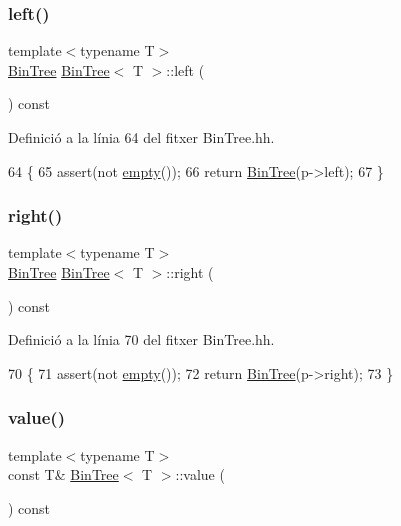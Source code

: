 \subsubsection{\texorpdfstring{left()}{left()}}
{\footnotesize\ttfamily template$<$typename T$>$ \\
\hyperlink{class_bin_tree}{Bin\+Tree} \hyperlink{class_bin_tree}{Bin\+Tree}$<$ T $>$\+::left (\begin{DoxyParamCaption}{ }\end{DoxyParamCaption}) const}



Definició a la línia 64 del fitxer Bin\+Tree.\+hh.


\begin{DoxyCode}
64                           \{
65         assert(not \hyperlink{class_bin_tree_a74cda259ba5c25b8ee38ed4dc33e4fad}{empty}());
66         \textcolor{keywordflow}{return} \hyperlink{class_bin_tree_a47eef22d29cd023449d97c073c08e5b6}{BinTree}(p->left);
67     \}
\end{DoxyCode}
\mbox{\label{class_bin_tree_aff8e96651b27284c329667b5ad3e4d0b}} 
\subsubsection{\texorpdfstring{right()}{right()}}
{\footnotesize\ttfamily template$<$typename T$>$ \\
\hyperlink{class_bin_tree}{Bin\+Tree} \hyperlink{class_bin_tree}{Bin\+Tree}$<$ T $>$\+::right (\begin{DoxyParamCaption}{ }\end{DoxyParamCaption}) const}



Definició a la línia 70 del fitxer Bin\+Tree.\+hh.


\begin{DoxyCode}
70                            \{
71         assert(not \hyperlink{class_bin_tree_a74cda259ba5c25b8ee38ed4dc33e4fad}{empty}());
72         \textcolor{keywordflow}{return} \hyperlink{class_bin_tree_a47eef22d29cd023449d97c073c08e5b6}{BinTree}(p->right);
73     \}
\end{DoxyCode}
\mbox{\label{class_bin_tree_a734e785b089c87b49187ee7c58edf5f3}} 
\subsubsection{\texorpdfstring{value()}{value()}}
{\footnotesize\ttfamily template$<$typename T$>$ \\
const T\& \hyperlink{class_bin_tree}{Bin\+Tree}$<$ T $>$\+::value (\begin{DoxyParamCaption}{ }\end{DoxyParamCaption}) const}



